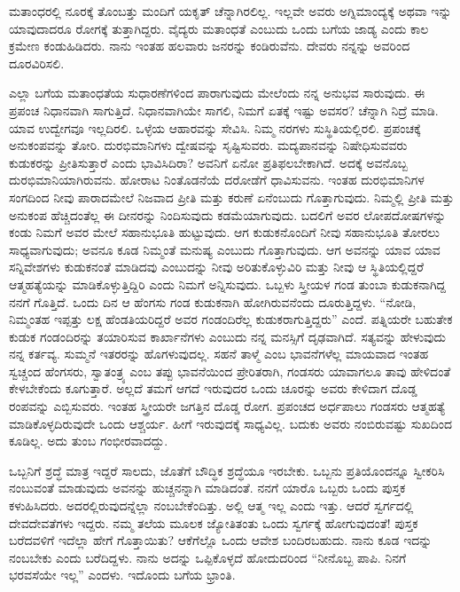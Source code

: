 ಮತಾಂಧರಲ್ಲಿ ನೂರಕ್ಕೆ ತೊಂಬತ್ತು ಮಂದಿಗೆ ಯಕೃತ್​ ಚೆನ್ನಾಗಿರಲಿಲ್ಲ. ಇಲ್ಲವೇ ಅವರು ಅಗ್ನಿಮಾಂದ್ಯಕ್ಕೆ ಅಥವಾ ಇನ್ನು ಯಾವುದಾದರೂ ರೋಗಕ್ಕೆ ತುತ್ತಾಗಿದ್ದರು. ವೈದ್ಯರು ಮತಾಂಧತೆ ಎಂಬುದು ಒಂದು ಬಗೆಯ ಜಾಡ್ಯ ಎಂದು ಕಾಲ ಕ್ರಮೇಣ ಕಂಡುಹಿಡಿದರು. ನಾನು ಇಂತಹ ಹಲವಾರು ಜನರನ್ನು ಕಂಡಿರುವೆನು. ದೇವರು ನನ್ನನ್ನು ಅವರಿಂದ ದೂರವಿರಿಸಲಿ.

ಎಲ್ಲಾ ಬಗೆಯ ಮತಾಂಧತೆಯ ಸುಧಾರಣೆಗಳಿಂದ ಪಾರಾಗುವುದು ಮೇಲೆಂದು ನನ್ನ ಅನುಭವ ಸಾರುವುದು. ಈ ಪ್ರಪಂಚ ನಿಧಾನವಾಗಿ ಸಾಗುತ್ತಿದೆ. ನಿಧಾನವಾಗಿಯೇ ಸಾಗಲಿ, ನಿಮಗೆ ಏತಕ್ಕೆ ಇಷ್ಟು ಅವಸರ? ಚೆನ್ನಾಗಿ ನಿದ್ರೆ ಮಾಡಿ. ಯಾವ ಉದ್ವೇಗವೂ ಇಲ್ಲದಿರಲಿ. ಒಳ್ಳೆಯ ಆಹಾರವನ್ನು ಸೇವಿಸಿ. ನಿಮ್ಮ ನರಗಳು ಸುಸ್ಥಿತಿಯಲ್ಲಿರಲಿ. ಪ್ರಪಂಚಕ್ಕೆ ಅನುಕಂಪವನ್ನು ತೋರಿ. ದುರಭಿಮಾನಿಗಳು ದ್ವೇಷವನ್ನು ಸೃಷ್ಟಿಸುವರು. ಮದ್ಯಪಾನವನ್ನು ನಿಷೇಧಿಸುವವರು ಕುಡುಕರನ್ನು ಪ್ರೀತಿಸುತ್ತಾರೆ ಎಂದು ಭಾವಿಸಿದಿರಾ? ಅವನಿಗೆ ಏನೋ ಪ್ರತಿಫಲಬೇಕಾಗಿದೆ. ಅದಕ್ಕೆ ಅವನೊಬ್ಬ ದುರಭಿಮಾನಿಯಾಗಿರುವನು. ಹೋರಾಟ ನಿಂತೊಡನೆಯೆ ದರೋಡೆಗೆ ಧಾವಿಸುವನು. ಇಂತಹ ದುರಭಿಮಾನಿಗಳ ಸಂಗದಿಂದ ನೀವು ಪಾರಾದಮೇಲೆ ನಿಜವಾದ ಪ್ರೀತಿ ಮತ್ತು ಕರುಣೆ ಏನೆಂಬುದು ಗೊತ್ತಾಗುವುದು. ನಿಮ್ಮಲ್ಲಿ ಪ್ರೀತಿ ಮತ್ತು ಅನುಕಂಪ ಹೆಚ್ಚಿದಂತೆಲ್ಲ ಈ ದೀನರನ್ನು ನಿಂದಿಸುವುದು ಕಡಮೆಯಾಗುವುದು. ಬದಲಿಗೆ ಅವರ ಲೋಪದೋಷಗಳನ್ನು ಕಂಡು ನಿಮಗೆ ಅವರ ಮೇಲೆ ಸಹಾನುಭೂತಿ ಹುಟ್ಟುವುದು. ಆಗ ಕುಡುಕನೊಂದಿಗೆ ನೀವು ಸಹಾನುಭೂತಿ ತೋರಲು ಸಾಧ್ಯವಾಗುವುದು; ಅವನೂ ಕೂಡ ನಿಮ್ಮಂತೆ ಮನುಷ್ಯ ಎಂಬುದು ಗೊತ್ತಾಗುವುದು. ಆಗ ಅವನನ್ನು ಯಾವ ಯಾವ ಸನ್ನಿವೇಶಗಳು ಕುಡುಕನಂತೆ ಮಾಡಿದವು ಎಂಬುದನ್ನು ನೀವು ಅರಿತುಕೊಳ್ಳುವಿರಿ ಮತ್ತು ನೀವು ಆ ಸ್ಥಿತಿಯಲ್ಲಿದ್ದರೆ ಆತ್ಮಹತ್ಯೆಯನ್ನು ಮಾಡಿಕೊಳ್ಳುತ್ತಿದ್ದಿರಿ ಎಂದು ನಿಮಗೆ ಅನ್ನಿಸುವುದು. ಒಬ್ಬಳು ಸ್ತ್ರೀಯಳ ಗಂಡ ತುಂಬಾ ಕುಡುಕನಾಗಿದ್ದ ನನಗೆ ಗೊತ್ತಿದೆ. ಒಂದು ದಿನ ಆ ಹೆಂಗಸು ಗಂಡ ಕುಡುಕನಾಗಿ ಹೋಗಿರುವನೆಂದು ದೂರುತ್ತಿದ್ದಳು. “ನೋಡಿ, ನಿಮ್ಮಂತಹ ಇಪ್ಪತ್ತು ಲಕ್ಷ ಹೆಂಡತಿಯರಿದ್ದರೆ ಅವರ ಗಂಡಂದಿರೆಲ್ಲ ಕುಡುಕರಾಗುತ್ತಿದ್ದರು” ಎಂದೆ. ಪತ್ನಿಯರೇ ಬಹುತೇಕ ಕುಡುಕ ಗಂಡಂದಿರನ್ನು ತಯಾರಿಸುವ ಕಾರ್ಖಾನೆಗಳು ಎಂಬುದು ನನ್ನ ಮನಸ್ಸಿಗೆ ದೃಢವಾಗಿದೆ. ಸತ್ಯವನ್ನು ಹೇಳುವುದು ನನ್ನ ಕರ್ತವ್ಯ. ಸುಮ್ಮನೆ ಇತರರನ್ನು ಹೊಗಳುವುದಲ್ಲ. ಸಹನೆ ತಾಳ್ಮೆ ಎಂಬ ಭಾವನೆಗಳೆಲ್ಲ ಮಾಯವಾದ ಇಂತಹ ಸ್ವಚ್ಚಂದ ಹೆಂಗಸರು, ಸ್ವಾತಂತ್ರ್ಯ ಎಂಬ ತಪ್ಪು ಭಾವನೆಯಿಂದ ಪ್ರೇರಿತರಾಗಿ, ಗಂಡಸರು ಯಾವಾಗಲೂ ತಾವು ಹೇಳಿದಂತೆ ಕೇಳಬೇಕೆಂದು ಕೂಗುತ್ತಾರೆ. ಅಲ್ಲದೆ ತಮಗೆ ಆಗದೆ ಇರುವುದರ ಒಂದು ಚೂರನ್ನು ಅವರು ಕೇಳಿದಾಗ ದೊಡ್ಡ ರಂಪವನ್ನು ಎಬ್ಬಿಸುವರು. ಇಂತಹ ಸ್ತ್ರೀಯರೇ ಜಗತ್ತಿನ ದೊಡ್ಡ ರೋಗ. ಪ್ರಪಂಚದ ಅರ್ಧಪಾಲು ಗಂಡಸರು ಆತ್ಮಹತ್ಯೆ ಮಾಡಿಕೊಳ್ಳದಿರುವುದೇ ಒಂದು ಆಶ್ಚರ್ಯ. ಹೀಗೆ ಇರುವುದಕ್ಕೆ ಸಾಧ್ಯವಿಲ್ಲ. ಬದುಕು ಅವರು ನಂಬಿರುವಷ್ಟು ಸುಖದಿಂದ ಕೂಡಿಲ್ಲ. ಅದು ತುಂಬ ಗಂಭೀರವಾದದ್ದು.

ಒಬ್ಬನಿಗೆ ಶ್ರದ್ಧೆ ಮಾತ್ರ ಇದ್ದರೆ ಸಾಲದು, ಜೊತೆಗೆ ಬೌದ್ಧಿಕ ಶ್ರದ್ಧೆಯೂ ಇರಬೇಕು. ಒಬ್ಬನು ಪ್ರತಿಯೊಂದನ್ನೂ ಸ್ವೀಕರಿಸಿ ನಂಬುವಂತೆ ಮಾಡುವುದು ಅವನನ್ನು ಹುಚ್ಚನನ್ನಾಗಿ ಮಾಡಿದಂತೆ. ನನಗೆ ಯಾರೊ ಒಬ್ಬರು ಒಂದು ಪುಸ್ತಕ ಕಳುಹಿಸಿದರು. ಅದರಲ್ಲಿರುವುದನ್ನೆಲ್ಲಾ ನಂಬಬೇಕೆಂದಿತ್ತು. ಅಲ್ಲಿ ಆತ್ಮ ಇಲ್ಲ ಎಂದು ಇತ್ತು. ಆದರೆ ಸ್ವರ್ಗದಲ್ಲಿ ದೇವದೇವತೆಗಳು ಇದ್ದರು. ನಮ್ಮ ತಲೆಯ ಮೂಲಕ ಜ್ಯೋತಿತಂತು ಒಂದು ಸ್ವರ್ಗಕ್ಕೆ ಹೋಗುವುದಂತೆ! ಪುಸ್ತಕ ಬರೆದವಳಿಗೆ ಇದೆಲ್ಲಾ ಹೇಗೆ ಗೊತ್ತಾಯಿತು? ಆಕೆಗೆಲ್ಲೊ ಒಂದು ಆವೇಶ ಬಂದಿರಬಹುದು. ನಾನು ಕೂಡ ಇದನ್ನು ನಂಬಬೇಕು ಎಂದು ಬರೆದಿದ್ದಳು. ನಾನು ಅದನ್ನು ಒಪ್ಪಿಕೊಳ್ಳದೆ ಹೋದುದರಿಂದ “ನೀನೊಬ್ಬ ಪಾಪಿ. ನಿನಗೆ ಭರವಸೆಯೇ ಇಲ್ಲ” ಎಂದಳು. ಇದೊಂದು ಬಗೆಯ ಭ್ರಾಂತಿ.

